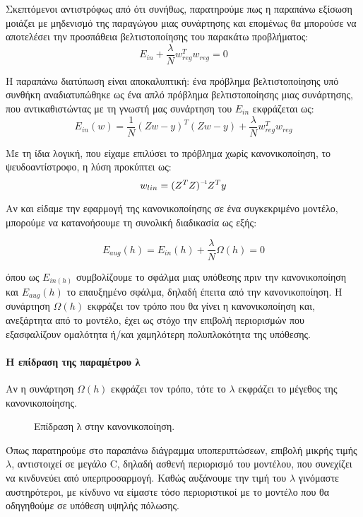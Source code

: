 Σκεπτόμενοι αντιστρόφως από ότι συνήθως, παρατηρούμε πως η παραπάνω εξίσωση μοιάζει με μηδενισμό της παραγώγου μιας συνάρτησης και επομένως θα μπορούσε να αποτελέσει την προσπάθεια βελτιστοποίησης του παρακάτω προβλήματος:
$$E_{in} + \frac{\lambda}{N} w^T_{reg} w_{reg}=0$$

Η παραπάνω διατύπωση είναι αποκαλυπτική: ένα πρόβλημα βελτιστοποίησης υπό συνθήκη αναδιατυπώθηκε ως ένα απλό πρόβλημα βελτιστοποίησης μιας συνάρτησης, που αντικαθιστώντας με τη γνωστή μας συνάρτηση του $E_{in}$ εκφράζεται ως:
$$E_{in}(w)=\frac{1}{N}(Zw-y)^T(Zw-y) + \frac{\lambda}{N} w^T_{reg} w_{reg} $$

Με τη ίδια λογική, που είχαμε επιλύσει το πρόβλημα χωρίς κανονικοποίηση, το ψευδοαντίστροφο, η λύση προκύπτει ως:
$$w_{lin}=\inv{ (Z^T Z)} Z^T y$$

Αν και είδαμε την εφαρμογή της κανονικοποίησης σε ένα συγκεκριμένο μοντέλο, μπορούμε να κατανοήσουμε τη συνολική διαδικασία ως εξής:

$$E_{aug}(h)= E_{in}(h) + \frac{\lambda}{N} \Omega(h)=0$$

όπου ως $E_{in(h)}$ συμβολίζουμε το σφάλμα μιας υπόθεσης πριν την κανονικοποίηση και $E_{aug}(h)$ το επαυξημένο σφάλμα, δηλαδή έπειτα από την κανονικοποίηση. Η συνάρτηση $\Omega(h)$ εκφράζει τον τρόπο που θα γίνει η κανονικοποίηση και, ανεξάρτητα από το μοντέλο, έχει ως στόχο την επιβολή περιορισμών που εξασφαλίζουν ομαλότητα ή/και χαμηλότερη πολυπλοκότητα της υπόθεσης.
\paragraph{Η επίδραση της παραμέτρου λ}
Αν η συνάρτηση $\Omega(h)$ εκφράζει τον τρόπο, τότε το $\lambda$ εκφράζει το μέγεθος της κανονικοποίησης.
\begin{figure}[H]
	\centering			
	\caption[Επίδραση λ στην κανονικοποίηση]{Επίδραση λ στην κανονικοποίηση.}
\end{figure}

Όπως παρατηρούμε στο παραπάνω διάγραμμα υποπεριπτώσεων, επιβολή μικρής τιμής $\lambda$, αντιστοιχεί σε μεγάλο C, δηλαδή ασθενή περιορισμό του μοντέλου, που συνεχίζει να κινδυνεύει από υπερπροσαρμογή. Καθώς αυξάνουμε την τιμή του $\lambda$ γινόμαστε αυστηρότεροι, με κίνδυνο να είμαστε τόσο περιοριστικοί με το μοντέλο που θα οδηγηθούμε σε υπόθεση υψηλής πόλωσης.

